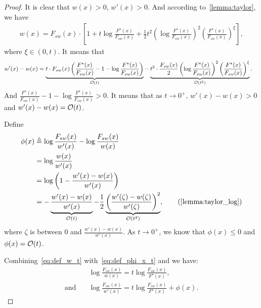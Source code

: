 \begin{proof}
It is clear that $w(x)>0$, $w'(x)>0$.
And according to~\cref{lemma:taylor}, we have
\begin{align*}
    w(x)=F_{sw}(x) \cdot \left[ 1+t \log{\frac{F^\star(x)}{F_{sw}(x)}} + \frac{1}{2}t^2 \left(\log{\frac{F^\star(x)}{F_{sw}(x)}}\right)^2 \left( \frac{F^\star(x)}{F_{sw}(x)} \right)^\xi \right],
\end{align*}
where $\xi \in (0,t)$.
It means that
\begin{align} \label{diff_w_w'}
    w'(x)-w(x) & = \underbrace{t \cdot F_{sw}(x) \left(\frac{F^\star(x)}{F_{sw}(x)} - 1 - \log \frac{F^\star(x)}{F_{sw}(x)} \right)}_{\mathcal{O} (t)} - \underbrace{t^2 \cdot \frac{F_{sw}(x)}{2} \left( \log \frac{F^\star(x)}{F_{sw}(x)} \right)^2 \left( \frac{F^\star(x)}{F_{sw}(x)} \right)^\xi}_{\mathcal{O} (t^2)}.
\end{align}
And $\frac{F^\star(x)}{F_{sw}(x)} - 1 - \log \frac{F^\star(x)}{F_{sw}(x)}>0$. It means that as $t \to 0^+$, $w'(x)-w(x)>0$ and $w'(x)-w(x) = \mathcal{O}(t)$.

Define
\begin{align}
    \phi(x) & \triangleq \log \frac{F_{sw}(x)}{w'(x)} - \log \frac{F_{sw}(x)}{w(x)} \label{eq:def_phi_x_t}
    \\ & = \log \frac{w(x)}{w'(x)} \nonumber
    \\ & = \log \left( 1-\frac{w'(x)-w(x)}{w'(x)} \right) \nonumber
    \\ & = -\underbrace{\frac{w'(x)-w(x)}{w'(x)}}_{\cO (t)} - \frac{1}{2}\underbrace{\left(\frac{w'(\zeta)-w(\zeta)}{w'(\zeta)} \right)^2}_{\cO (t^2)}, \tag{\cref{lemma:taylor_log}}
\end{align}
where $\zeta$ is between $0$ and $\frac{w'(x)-w(x)}{w'(x)}$.
As $t \to 0^+$, we know that $\phi(x) \le 0$ and $\phi(x) = \mathcal{O} (t)$.

Combining~\eqref{eq:def_w_t} with~\eqref{eq:def_phi_x_t} and we have:
\begin{align}
    & \log \frac{F_{sw}(x)}{w(x)} = t \log \frac{F_{sw}(x)}{F^\star(x)}, \nonumber \\
    \text{and} \quad  & \log \frac{F_{sw}(x)}{w'(x)} = t \log \frac{F_{sw}(x)}{F^\star(x)} + \phi(x). \label{equation:w_w}
\end{align}


\end{proof}
